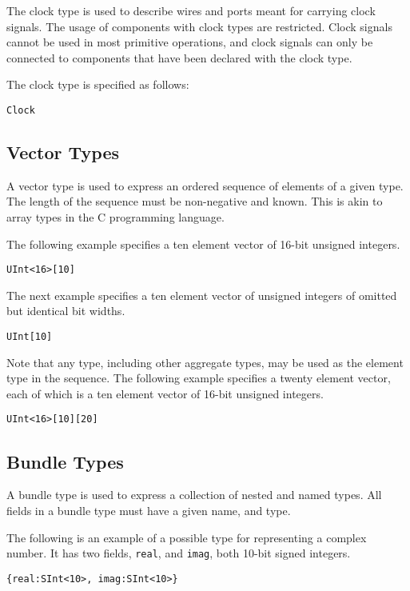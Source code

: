 \documentclass[12pt]{article}
\begin{document}
The clock type is used to describe wires and ports meant for carrying clock signals. The usage of components with clock types are restricted. Clock signals cannot be used in most primitive operations, and clock signals can only be connected to components that have been declared with the clock type. 

The clock type is specified as follows:
\begin{verbatim}
Clock
\end{verbatim}  

\subsection{Vector Types}

A vector type is used to express an ordered sequence of elements of a given type. The length of the sequence must be non-negative and known. This is akin to array types in the C programming language.

The following example specifies a ten element vector of 16-bit unsigned integers.
\begin{verbatim}
UInt<16>[10]
\end{verbatim}  

The next example specifies a ten element vector of unsigned integers of omitted but identical bit widths.
\begin{verbatim}
UInt[10]
\end{verbatim}

Note that any type, including other aggregate types, may be used as the element type in the sequence. The following example specifies a twenty element vector, each of which is a ten element vector of 16-bit unsigned integers.
\begin{verbatim}
UInt<16>[10][20]
\end{verbatim} 

\subsection{Bundle Types}

A bundle type is used to express a collection of nested and named types. All fields in a bundle type must have a given name, and type. 

The following is an example of a possible type for representing a complex number. It has two fields, \verb|real|, and \verb|imag|, both 10-bit signed integers.
\begin{verbatim}
{real:SInt<10>, imag:SInt<10>}
\end{verbatim}
\end{document}
